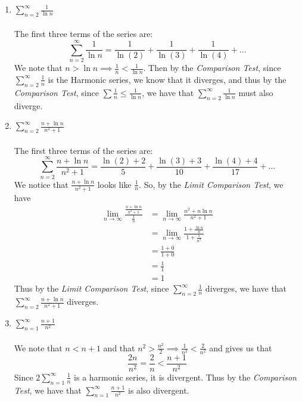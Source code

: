 \documentclass[12pt,letterpaper]{article}
\newcommand{\limx}[2]{\displaystyle\lim\limits_{#1 \to #2}}
\theoremstyle{case}
\theoremstyle{definition}
\begin{document}
\begin{enumerate}
\begin{enumerate}
			\item $\displaystyle\sum_{n=2}^{\infty} \frac{1}{\ln n}$
			\\\\The first three terms of the series are:
			\[\sum_{n=2}^{\infty} \frac{1}{\ln n}=\frac{1}{\ln (2)} + \frac{1}{\ln (3)} + \frac{1}{\ln (4)} + \dots\]
			We note that $n > \ln n \implies \frac{1}{n} < \frac{1}{\ln n}$. Then by the \textit{Comparison Test}, since $\displaystyle\sum_{n=2}^{\infty} \frac{1}{n}$ is the Harmonic series, we know that it diverges, and thus by the \textit{Comparison Test}, since $\sum \frac{1}{n} \leq \frac{1}{\ln n}$, we have that $\displaystyle\sum_{n=2}^{\infty} \frac{1}{\ln n}$ must also diverge.\\
			\item $\displaystyle\sum_{n=2}^{\infty} \frac{n+\ln n}{n^2+1}$
			\\\\The first three terms of the series are:
			\[\sum_{n=2}^{\infty} \frac{n+\ln n}{n^2+1}=\frac{\ln(2)+2}{5}+\frac{\ln(3)+3}{10} + \frac{\ln(4)+4}{17}+\dots\]
			We notice that $\displaystyle\frac{n+\ln n}{n^2+1}$ looks like $\displaystyle\frac{1}{n}$. So, by the \textit{Limit Comparison Test}, we have
			\begin{align*}
				\limx{n}{\infty} \frac{\frac{n+\ln n}{n^2+1}}{\frac{1}{n}} &= \limx{n}{\infty} \frac{n^2+n\ln n}{n^2 +1} \\
				&= \limx{n}{\infty} \frac{1+\frac{\ln n}{n}}{1+\frac{1}{n^2}} \\
				&= \frac{1+0}{1+0} \\
				&= \frac{1}{1} \\
				&= 1
			\end{align*}
			Thus by the \textit{Limit Comparison Test}, since $\displaystyle\sum_{n=2}^{\infty} \frac{1}{n}$ diverges, we have that $\displaystyle\sum_{n=2}^{\infty} \frac{n+\ln n}{n^2 + 1}$ diverges. \\
			
			\item $\displaystyle\sum_{n=1}^{\infty} \frac{n+1}{n^2}$
			\\\\We note that $n < n+1$ and that $n^2 > \frac{n^2}{2} \implies \frac{1}{n^2}<\frac{2}{n^2}$ and gives us that
			\[\frac{2n}{n^2}=\frac{2}{n}<\frac{n+1}{n^2}\]
			Since $\displaystyle 2 \sum_{n=1}^{\infty} \frac{1}{n}$ is a harmonic series, it is divergent. Thus by the \textit{Comparison Test}, we have that $\displaystyle\sum_{n=1}^{\infty} \frac{n+1}{n^2}$ is also divergent.\\
			

\end{enumerate}
\end{enumerate}
\end{document}
